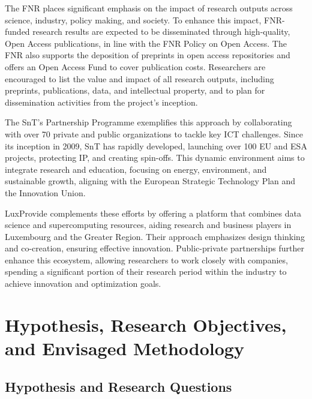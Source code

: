 \documentclass{article}
\begin{document}
The FNR places significant emphasis on the impact of research outputs across science, industry, policy making, and society. To enhance this impact, FNR-funded research results are expected to be disseminated through high-quality, Open Access publications, in line with the FNR Policy on Open Access. The FNR also supports the deposition of preprints in open access repositories and offers an Open Access Fund to cover publication costs. Researchers are encouraged to list the value and impact of all research outputs, including preprints, publications, data, and intellectual property, and to plan for dissemination activities from the project's inception.

The SnT’s Partnership Programme exemplifies this approach by collaborating with over 70 private and public organizations to tackle key ICT challenges. Since its inception in 2009, SnT has rapidly developed, launching over 100 EU and ESA projects, protecting IP, and creating spin-offs. This dynamic environment aims to integrate research and education, focusing on energy, environment, and sustainable growth, aligning with the European Strategic Technology Plan and the Innovation Union.

LuxProvide complements these efforts by offering a platform that combines data science and supercomputing resources, aiding research and business players in Luxembourg and the Greater Region. Their approach emphasizes design thinking and co-creation, ensuring effective innovation. Public-private partnerships further enhance this ecosystem, allowing researchers to work closely with companies, spending a significant portion of their research period within the industry to achieve innovation and optimization goals.

\section{Hypothesis, Research Objectives, and Envisaged Methodology}

\subsection{Hypothesis and Research Questions}
\end{document}

